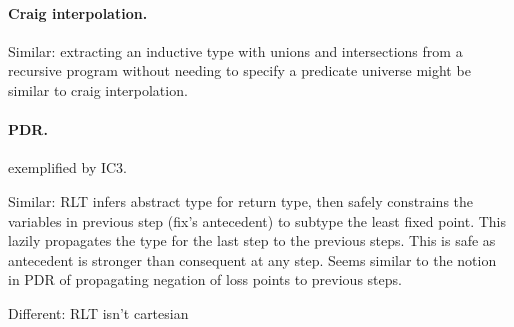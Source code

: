 \documentclass[acmsmall]{acmart}
\begin{document}
\paragraph{Craig interpolation.} 
Similar: extracting an inductive type with unions and intersections 
from a recursive program without needing to specify a predicate universe might be similar to
craig interpolation.

\paragraph{PDR.}
exemplified by IC3. 

Similar: RLT infers abstract type for return type, 
then safely constrains the variables in previous step (fix's antecedent) 
to subtype the least fixed point.
This lazily propagates the type for the last step to the previous steps.
This is safe as antecedent is stronger than consequent at any step.
Seems similar to the notion in PDR of propagating negation of loss points to previous steps. 

Different: RLT isn't cartesian
\end{document}
